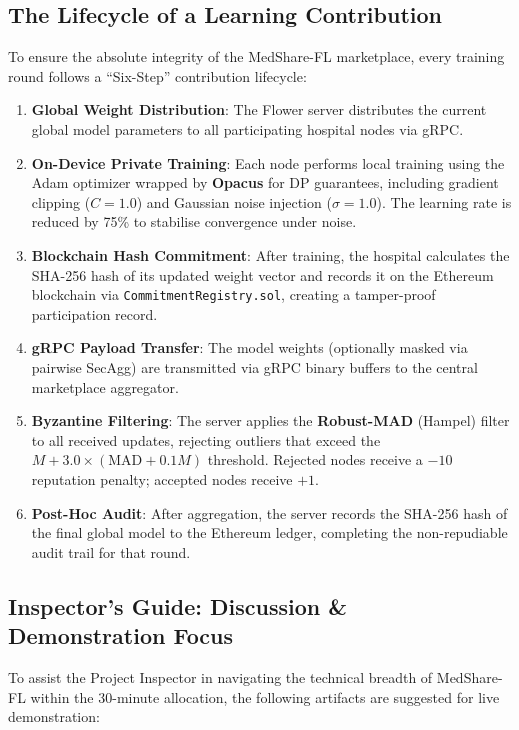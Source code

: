 \documentclass[10pt, a4paper, twocolumn]{article}
\begin{document}
\subsection{The Lifecycle of a Learning Contribution}
To ensure the absolute integrity of the MedShare-FL marketplace, every training round follows a ``Six-Step'' contribution lifecycle:
\begin{enumerate}
    \item \textbf{Global Weight Distribution}: The Flower server distributes the current global model parameters to all participating hospital nodes via gRPC.
    \item \textbf{On-Device Private Training}: Each node performs local training using the Adam optimizer wrapped by \textbf{Opacus} for DP guarantees, including gradient clipping ($C=1.0$) and Gaussian noise injection ($\sigma=1.0$). The learning rate is reduced by 75\% to stabilise convergence under noise.
    \item \textbf{Blockchain Hash Commitment}: After training, the hospital calculates the SHA-256 hash of its updated weight vector and records it on the Ethereum blockchain via \texttt{CommitmentRegistry.sol}, creating a tamper-proof participation record.
    \item \textbf{gRPC Payload Transfer}: The model weights (optionally masked via pairwise SecAgg) are transmitted via gRPC binary buffers to the central marketplace aggregator.
    \item \textbf{Byzantine Filtering}: The server applies the \textbf{Robust-MAD} (Hampel) filter to all received updates, rejecting outliers that exceed the $M + 3.0 \times (\text{MAD} + 0.1M)$ threshold. Rejected nodes receive a $-10$ reputation penalty; accepted nodes receive $+1$.
    \item \textbf{Post-Hoc Audit}: After aggregation, the server records the SHA-256 hash of the final global model to the Ethereum ledger, completing the non-repudiable audit trail for that round.
\end{enumerate}

\subsection{Inspector's Guide: Discussion \& Demonstration Focus}
To assist the Project Inspector in navigating the technical breadth of MedShare-FL within the 30-minute allocation, the following artifacts are suggested for live demonstration:
\end{document}
